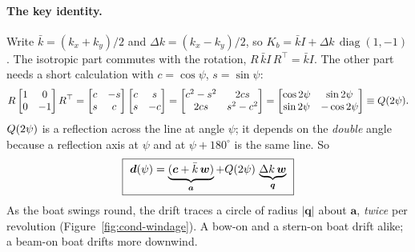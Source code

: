 \paragraph{The key identity.} Write $\bar k = (k_x+k_y)/2$ and
$\Delta k = (k_x - k_y)/2$, so $K_b = \bar k I + \Delta k\,\operatorname{diag}(1,-1)$.
The isotropic part commutes with the rotation, $R\,\bar kI\,R^\top = \bar k I$. The
other part needs a short calculation with $c = \cos\psi$, $s = \sin\psi$:
\[
  R\begin{bmatrix}1&0\\0&-1\end{bmatrix}R^\top
  = \begin{bmatrix}c&-s\\s&c\end{bmatrix}\begin{bmatrix}c&s\\s&-c\end{bmatrix}
  = \begin{bmatrix}c^2-s^2 & 2cs\\ 2cs & s^2-c^2\end{bmatrix}
  = \begin{bmatrix}\cos2\psi & \sin2\psi\\ \sin2\psi & -\cos2\psi\end{bmatrix}
  \equiv Q(2\psi).
\]
$Q(2\psi)$ is a reflection across the line at angle $\psi$; it depends on the
\emph{double} angle because a reflection axis at $\psi$ and at $\psi+180^\circ$ is
the same line. So
\[
  \boxed{\ \bm d(\psi) = \underbrace{(\bm c + \bar k\,\bm w)}_{\bm a}
                        + Q(2\psi)\,\underbrace{\Delta k\,\bm w}_{\bm q}\ }
\]
As the boat swings round, the drift traces a circle of radius $|\bm q|$ about
$\bm a$, \emph{twice} per revolution (Figure~\ref{fig:cond-windage}). A bow-on
and a stern-on boat drift alike; a beam-on boat drifts more downwind.

